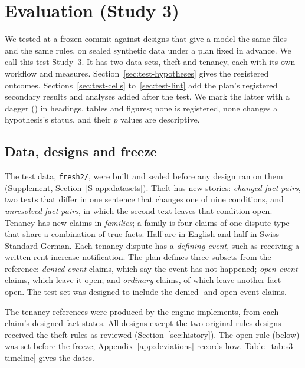 \section{Evaluation (Study 3)}
\label{sec:test}

We tested \casepath at a frozen commit against designs that give a model the same files and the same rules, on sealed synthetic data under a plan fixed in advance. We call this test Study~3. It has two data sets, theft and tenancy, each with its own workflow and measures. Section~\ref{sec:test-hypotheses} gives the registered outcomes. Sections~\ref{sec:test-cells} to~\ref{sec:test-lint} add the plan's registered secondary results and analyses added after the test. We mark the latter with a dagger (\dag) in headings, tables and figures; none is registered, none changes a hypothesis's status, and their $p$ values are descriptive.

\subsection{Data, designs and freeze}
\label{sec:test-data}

The test data, \texttt{fresh2/}, were built and sealed before any design ran on them (Supplement, Section~\ref{S-app:datasets}). Theft has \sthreeStories{} new stories: \sthreePairsChanged{} \emph{changed-fact pairs}, two texts that differ in one sentence that changes one of nine conditions, and \sthreePairsUnresolved{} \emph{unresolved-fact pairs}, in which the second text leaves that condition open. Tenancy has \sthreeClaims{} new claims in \sthreeFamilies{} \emph{families}; a family is four claims of one dispute type that share a combination of true facts. Half are in English and half in Swiss Standard German. Each tenancy dispute has a \emph{defining event}, such as receiving a written rent-increase notification. The plan defines three subsets from the reference: \sthreeClaimsDenied{} \emph{denied-event} claims, which say the event has not happened; \sthreeClaimsOpenEvent{} \emph{open-event} claims, which leave it open; and \sthreeClaimsOrdinary{} \emph{ordinary} claims, of which \sthreeClaimsOpenBranch{} leave another fact open. The test set was designed to include the denied- and open-event claims.

The tenancy references were produced by the engine \casepath implements, from each claim's designed fact states. All designs except the two original-rules designs received the theft rules as reviewed (Section~\ref{sec:history}). The open rule (below) was set before the freeze; Appendix~\ref{app:deviations} records how. Table~\ref{tab:s3-timeline} gives the dates.

